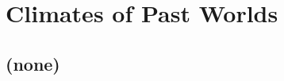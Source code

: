 
\cleardoublepage


\chapter{Climates of Past Worlds}\label{ch:past-worlds}

\hfill \break

\newpage

\section{(none)}

